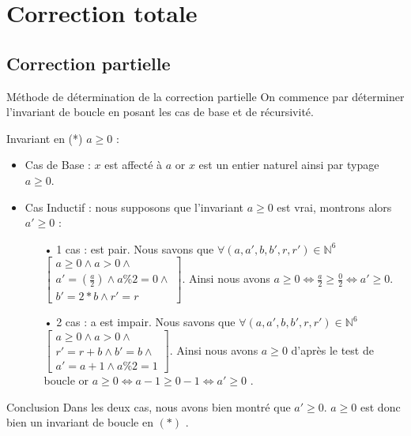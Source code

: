 \documentclass[12pt,a4paper]{report}
\begin{document}

\section*{Correction totale}
\subsection{Correction partielle}
\begin{mybox}{Méthode de détermination de la correction partielle}
On commence par déterminer l'invariant de boucle en posant les cas de base
et de récursivité.
\end{mybox}
\begin{flushleft}
Invariant en (*) $  a\geq 0 $  : \\
\begin{itemize}
\item Cas de Base :  $x$ est affect\'{e} \`{a} $a$ or $x$ est un entier naturel ainsi par typage $a\ge 0$.
\item Cas Inductif : nous supposons que l'invariant  $a\ge 0$ est vrai, montrons alors $ a' \geq 0 $ :
\begin{itemize}
\item[•]  1 cas :  est pair. Nous savons que $\forall(a,a',b,b',r,r')\in \mathbb{N}^{6}$ $\left[ \begin{array}{c}a\ge 0\wedge a>0\wedge \\
   a '=(\frac{a}{2})\wedge a\%2=0 \wedge \\
b '=2*b\wedge r '=r\end{array}
\right]$. Ainsi nous avons $a\ge 0\Leftrightarrow \frac{a}{2}\ge \frac{0}{2}\Leftrightarrow a ' \ge 0$.
\item[•] 2 cas : a est impair. Nous savons que $\forall(a,a',b,b',r,r')\in \mathbb{N}^{6}$ $\left[ \begin{array}{c}a\ge 0\wedge a>0\wedge \\
   r '= r+b\wedge b'=b  \wedge \\
a '=a+1\wedge a\%2=1\end{array}
\right]$. Ainsi nous avons  $a\ge 0$ d’après le test de boucle or  $  a\geq 0  \Leftrightarrow a-1 \ge 0-1 \Leftrightarrow a' \ge 0$ .
\bigskip
\end{itemize}
\end{itemize}
\begin{Cas1}{Conclusion}
 Dans les deux cas, nous avons bien montré que  $ a' \ge 0 $. $a \geq 0$ est donc bien un invariant de boucle en $(*)$ .
\end{Cas1}
\end{flushleft}
\end{document}
